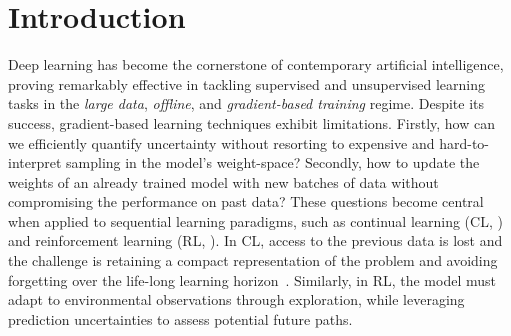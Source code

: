 \documentclass{article}
\begin{document}

\section{Introduction}
\label{sec:intro}
%
Deep learning \cite{goodfellow2016deep} has become the cornerstone of contemporary artificial intelligence, proving remarkably effective in tackling supervised and unsupervised learning tasks in the {\em large data}, {\em offline}, and {\em gradient-based training} regime. Despite its success, gradient-based learning techniques exhibit limitations. Firstly, how can we efficiently quantify uncertainty without resorting to expensive and hard-to-interpret sampling in the model's weight-space? Secondly, how to update the weights of an already trained model with new batches of data without compromising the performance on past data? These questions become central when applied to sequential learning paradigms, such as continual learning (CL, \citep{parisi2019continual, de2021continual}) and reinforcement learning (RL, \cite{sutton2018reinforcement}). In CL, access to the previous data is lost and the challenge is retaining a compact representation of the problem and avoiding forgetting over the life-long learning horizon~\cite{mccloskey1989catastrophic}. Similarly, in RL, the model must adapt to environmental observations through exploration, while leveraging prediction uncertainties to assess potential future paths.

\end{document}
